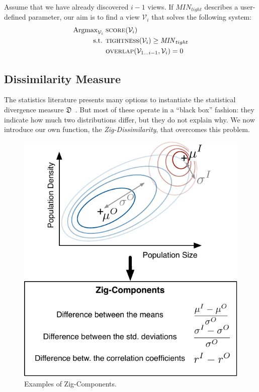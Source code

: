 \begin{problem}
    Assume that we have already discovered $i-1$ views. If $\mathit{MIN}_{tight}$
describes a user-defined parameter, our aim is to find a view $\mathcal{V}_i$
that solves the following system:
\begin{equation}
    \label{eq:objective}
    \begin{aligned}
        \text{Argmax}_{\mathcal{V}_i}\; 
        & \textsc{score} (\mathcal{V}_i)\\
         \text{s.t.  } 
         &\textsc{tightness}(\mathcal{V}_i) \geq \mathit{MIN}_{tight}\\ 
         &\textsc{overlap}(\mathcal{V}_{1\ldots i-1},\mathcal{V}_i) = 0\\
    \end{aligned}
\end{equation}
\end{problem}

\subsection{Dissimilarity Measure}
The statistics literature presents many options to instantiate the statistical 
divergence measure $\mathfrak{D}$~\cite{wasserman2013all}. But most of these
operate in a ``black box'' fashion: they indicate how much two distributions
differ, but they do not explain why. We now introduce our own function, the
\emph{Zig-Dissimilarity}, that overcomes this problem.
\pagebreak

\begin{figure}[t!]
    \centering
    \includegraphics[width=.8\columnwidth]{Images/Zig-Dissimilarity}
    \caption{Examples of Zig-Components.}
    \label{fig:zig-dissim}
\end{figure}

